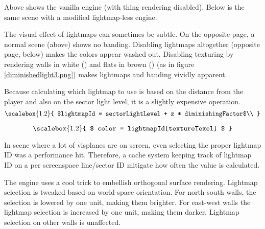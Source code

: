 
Above shows the vanilla engine (with thing rendering disabled). Below is the same scene with a modified lightmap-less engine.
\vspace{2mm}

\vspace{-10pt}
\par
The visual effect of lightmaps can sometimes be subtle. On the opposite page, a normal scene (above) shows no banding. Disabling lightmaps altogether (opposite page, below) makes the colors appear washed out. Disabling texturing by rendering walls in white () and flats in brown () (as in figure \ref{diminishedlight3.png}) makes lightmaps and banding vividly apparent.\\
\par
Because calculating which lightmap to use is based on the distance from the player and also on the sector light level, it is a slightly expensive operation.\\
\vspace{10pt}
\begin{equation*}
    \scalebox{1.2}{
$lightmapId = sectorLightLevel + z * diminishingFactor$\\
}
\end{equation*}
\par
\begin{equation*}
    \scalebox{1.2}{
$   color = lightmapId[textureTexel] $
}
\end{equation*}
\par
\vspace{10pt}
 In scene where a lot of visplanes are on screen, even selecting the proper lightmap ID was a performance hit. Therefore, a cache system keeping track of lightmap ID on a per screenspace line/sector ID mitigate how often the value is calculated.\\%
 \par
 The engine uses a cool trick to embellish orthogonal surface rendering. Lightmap selection is tweaked based on world-space orientation. For north-south walls, the selection is lowered by one unit, making them brighter. For east-west walls the lightmap selection is increased by one unit, making them darker. Lightmap selection on other walls is unaffected.\\



